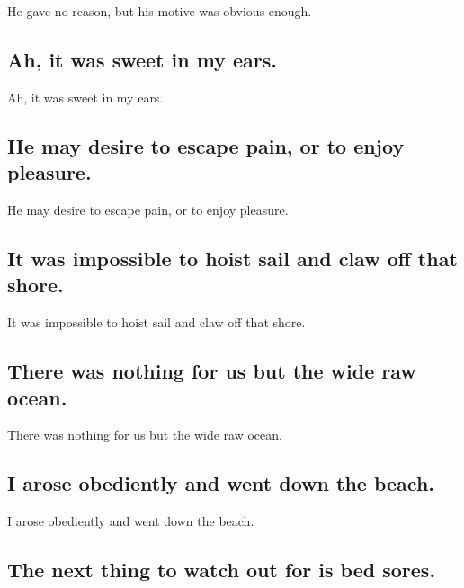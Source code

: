 \documentclass[]{article}
\begin{document}
He gave no reason, but his motive was obvious enough.

\hypertarget{ah-it-was-sweet-in-my-ears.}{%
\subsection{Ah, it was sweet in my
ears.}\label{ah-it-was-sweet-in-my-ears.}}

Ah, it was sweet in my ears.

\hypertarget{he-may-desire-to-escape-pain-or-to-enjoy-pleasure.}{%
\subsection{He may desire to escape pain, or to enjoy
pleasure.}\label{he-may-desire-to-escape-pain-or-to-enjoy-pleasure.}}

He may desire to escape pain, or to enjoy pleasure.

\hypertarget{it-was-impossible-to-hoist-sail-and-claw-off-that-shore.}{%
\subsection{It was impossible to hoist sail and claw off that
shore.}\label{it-was-impossible-to-hoist-sail-and-claw-off-that-shore.}}

It was impossible to hoist sail and claw off that shore.

\hypertarget{there-was-nothing-for-us-but-the-wide-raw-ocean.}{%
\subsection{There was nothing for us but the wide raw
ocean.}\label{there-was-nothing-for-us-but-the-wide-raw-ocean.}}

There was nothing for us but the wide raw ocean.

\hypertarget{i-arose-obediently-and-went-down-the-beach.}{%
\subsection{I arose obediently and went down the
beach.}\label{i-arose-obediently-and-went-down-the-beach.}}

I arose obediently and went down the beach.

\hypertarget{the-next-thing-to-watch-out-for-is-bed-sores.}{%
\subsection{The next thing to watch out for is bed
sores.}\label{the-next-thing-to-watch-out-for-is-bed-sores.}}
\end{document}
